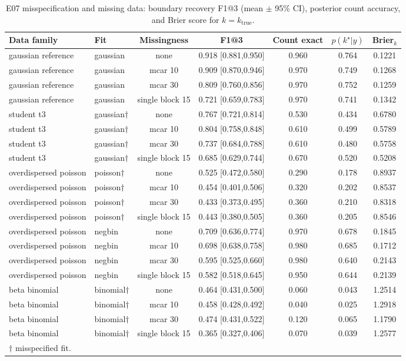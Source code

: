 \begin{table}[!htbp]
\centering
\footnotesize
\caption{E07 misspecification and missing data: boundary recovery F1@3 (mean $\pm$ 95\% CI), posterior count accuracy, and Brier score for $k=k_\mathrm{true}$.}
\label{tab:E07-robustness}
\begin{tabular}{llccccc}
\hline
Data family & Fit & Missingness & F1@3 & Count exact & $p(k^\star|y)$ & Brier$_k$ \\
\hline
gaussian reference & gaussian & none & 0.918 [0.881,0.950] & 0.960 & 0.764 & 0.1221 \\
gaussian reference & gaussian & mcar 10 & 0.909 [0.870,0.946] & 0.970 & 0.749 & 0.1268 \\
gaussian reference & gaussian & mcar 30 & 0.809 [0.760,0.856] & 0.970 & 0.752 & 0.1259 \\
gaussian reference & gaussian & single block 15 & 0.721 [0.659,0.783] & 0.970 & 0.741 & 0.1342 \\
student t3 & gaussian$\dag$ & none & 0.767 [0.721,0.814] & 0.530 & 0.434 & 0.6780 \\
student t3 & gaussian$\dag$ & mcar 10 & 0.804 [0.758,0.848] & 0.610 & 0.499 & 0.5789 \\
student t3 & gaussian$\dag$ & mcar 30 & 0.737 [0.684,0.788] & 0.610 & 0.480 & 0.5758 \\
student t3 & gaussian$\dag$ & single block 15 & 0.685 [0.629,0.744] & 0.670 & 0.520 & 0.5208 \\
overdispersed poisson & poisson$\dag$ & none & 0.525 [0.472,0.580] & 0.290 & 0.178 & 0.8937 \\
overdispersed poisson & poisson$\dag$ & mcar 10 & 0.454 [0.401,0.506] & 0.320 & 0.202 & 0.8537 \\
overdispersed poisson & poisson$\dag$ & mcar 30 & 0.433 [0.373,0.495] & 0.360 & 0.210 & 0.8318 \\
overdispersed poisson & poisson$\dag$ & single block 15 & 0.443 [0.380,0.505] & 0.360 & 0.205 & 0.8546 \\
overdispersed poisson & negbin & none & 0.709 [0.636,0.774] & 0.970 & 0.678 & 0.1845 \\
overdispersed poisson & negbin & mcar 10 & 0.698 [0.638,0.758] & 0.980 & 0.685 & 0.1712 \\
overdispersed poisson & negbin & mcar 30 & 0.595 [0.525,0.660] & 0.980 & 0.640 & 0.2143 \\
overdispersed poisson & negbin & single block 15 & 0.582 [0.518,0.645] & 0.950 & 0.644 & 0.2139 \\
beta binomial & binomial$\dag$ & none & 0.464 [0.431,0.500] & 0.060 & 0.043 & 1.2514 \\
beta binomial & binomial$\dag$ & mcar 10 & 0.458 [0.428,0.492] & 0.040 & 0.025 & 1.2918 \\
beta binomial & binomial$\dag$ & mcar 30 & 0.474 [0.431,0.522] & 0.120 & 0.065 & 1.1790 \\
beta binomial & binomial$\dag$ & single block 15 & 0.365 [0.327,0.406] & 0.070 & 0.039 & 1.2577 \\
\hline
\multicolumn{7}{l}{\small$\dag$ misspecified fit.} \\
\end{tabular}
\end{table}
